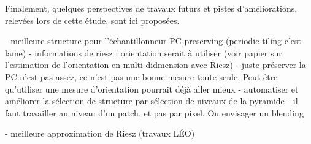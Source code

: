 \bigskip

Finalement, quelques perspectives de travaux futurs et pistes d'améliorations, relevées lors de cette étude, sont ici proposées.

- meilleure structure pour l'échantillonneur PC preserving (periodic tiling c'est lame)
- informations de riesz : orientation serait à utiliser (voir papier sur l'estimation de l'orientation en multi-didmension avec Riesz)
- juste préserver la PC n'est pas assez, ce n'est pas une bonne mesure toute seule. Peut-être qu'utiliser une mesure d'orientation pourrait déjà aller mieux
- automatiser et améliorer la sélection de structure par sélection de niveaux de la pyramide
- il faut travailler au niveau d'un patch, et pas par pixel. Ou envisager un blending

- meilleure approximation de Riesz (travaux LÉO) %